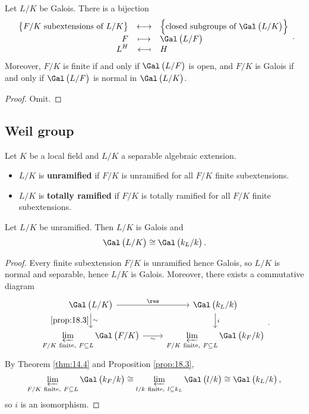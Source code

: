\begin{theorem}
Let $ L / K $ be Galois. There is a bijection
$$ \bijection{\cbr{F / K \ \text{subextensions of} \ L / K}}{\cbr{\text{closed subgroups of} \ \Gal\br{L / K}}}{F}{\Gal\br{L / F}}{L^H}{H}. $$
Moreover, $ F / K $ is finite if and only if $ \Gal\br{L / F} $ is open, and $ F / K $ is Galois if and only if $ \Gal\br{L / F} $ is normal in $ \Gal\br{L / K} $.
\end{theorem}

\begin{proof}
Omit.
\end{proof}

\subsection{Weil group}

Let $ K $ be a local field and $ L / K $ a separable algebraic extension.

\begin{definition}
\hfill
\begin{itemize}
\item $ L / K $ is \textbf{unramified} if $ F / K $ is unramified for all $ F / K $ finite subextensions.
\item $ L / K $ is \textbf{totally ramified} if $ F / K $ is totally ramified for all $ F / K $ finite subextensions.
\end{itemize}
\end{definition}

\begin{proposition}
Let $ L / K $ be unramified. Then $ L / K $ is Galois and
$$ \Gal\br{L / K} \cong \Gal\br{k_L / k}. $$
\end{proposition}

\begin{proof}
Every finite subextension $ F / K $ is unramified hence Galois, so $ L / K $ is normal and separable, hence $ L / K $ is Galois. Moreover, there exists a commutative diagram
$$
\begin{tikzcd}
\Gal\br{L / K} \arrow{r}{\res} \arrow{d}{\sim}[swap]{\ref{prop:18.3}} & \Gal\br{k_L / k} \arrow{d}{i} \\
\displaystyle\varprojlim_{F / K \ \text{finite}, \ F \subseteq L} \Gal\br{F / K} \arrow{r}[swap]{\sim} & \displaystyle\varprojlim_{F / K \ \text{finite}, \ F \subseteq L} \Gal\br{k_F / k}
\end{tikzcd}.
$$
By Theorem \ref{thm:14.4} and Proposition \ref{prop:18.3},
$$ \varprojlim_{F / K \ \text{finite}, \ F \subseteq L} \Gal\br{k_F / k} \cong \varprojlim_{l / k \ \text{finite}, \ l \subseteq k_L} \Gal\br{l / k} \cong \Gal\br{k_L / k}, $$
so $ i $ is an isomorphism.
\end{proof}

